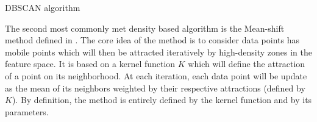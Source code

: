 \documentclass[a4paper]{report}
\begin{document}
    \begin{algorithm}
        \caption{DBSCAN algorithm}
        \label{alg:dbscan}

    \end{algorithm}

    The second most commonly met density based algorithm is the Mean-shift method defined in \cite{cheng1995mean}. The core idea of the method is to consider data points has mobile points which will then be attracted iteratively by high-density zones in the feature space. It is based on a kernel function $K$ which will define the attraction of a point on its neighborhood. At each iteration, each data point will be update as the mean of its neighbors weighted by their respective attractions (defined by $K$). By definition, the method is entirely defined by the kernel function and by its parameters.
\end{document}

